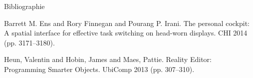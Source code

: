 \begin{frame}[allowframebreaks]{Bibliographie}
  \begin{thebibliography}{10}
      Barrett M. Ens and Rory Finnegan and Pourang P. Irani.
      \newblock The personal cockpit: A spatial interface for effective task switching on head-worn displays.
      \newblock CHI 2014 (pp. 3171--3180).

        Heun, Valentin and Hobin, James and Maes, Pattie.
        \newblock Reality Editor: Programming Smarter Objects.
        \newblock UbiComp 2013 (pp. 307--310).
  \end{thebibliography}
\end{frame}